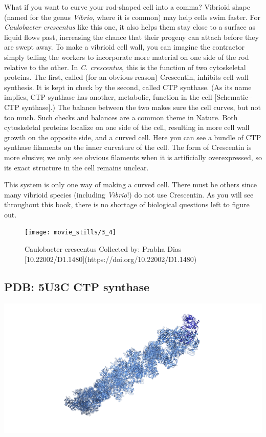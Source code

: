 \documentclass[]{tufte-book}
\begin{document}
What if you want to curve your rod-shaped cell into a comma? Vibrioid
shape (named for the genus \emph{Vibrio}, where it is common) may help
cells swim faster. For \emph{Caulobacter crescentus} like this one, it
also helps them stay close to a surface as liquid flows past, increasing
the chance that their progeny can attach before they are swept away. To
make a vibrioid cell wall, you can imagine the contractor simply telling
the workers to incorporate more material on one side of the rod relative
to the other. In \emph{C. crescentus}, this is the function of two
cytoskeletal proteins. The first, called (for an obvious reason)
Crescentin, inhibits cell wall synthesis. It is kept in check by the
second, called CTP synthase. (As its name implies, CTP synthase has
another, metabolic, function in the cell {[}Schematic--CTP synthase{]}.)
The balance between the two makes sure the cell curves, but not too
much. Such checks and balances are a common theme in Nature. Both
cytoskeletal proteins localize on one side of the cell, resulting in
more cell wall growth on the opposite side, and a curved cell. Here you
can see a bundle of CTP synthase filaments on the inner curvature of the
cell. The form of Crescentin is more elusive; we only see obvious
filaments when it is artificially overexpressed, so its exact structure
in the cell remains unclear.

This system is only one way of making a curved cell. There must be
others since many vibrioid species (including \emph{Vibrio}!) do not use
Crescentin. As you will see throughout this book, there is no shortage
of biological questions left to figure out.

\begin{figure}
\texttt{[image: movie\_stills/3\_4]} \caption[Caulobacter crescentus Collected by]{Caulobacter crescentus Collected by: Prabha Dias [10.22002/D1.1480](https://doi.org/10.22002/D1.1480)}\label{fig:unnamed-chunk-50}
\end{figure}

\subsection{PDB: 5U3C CTP synthase}\label{PDB:_5U3C_CTP_synthase}

\includegraphics{img/schematics/3_4_1}
\end{document}
